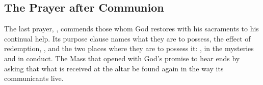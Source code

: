 \subsection{The Prayer after Communion}

The last prayer, , commends
those whom God restores with his sacraments to his continual help. Its purpose
clause names what they are to possess, the effect of redemption,
, and the two places where they are to possess
it: , in the mysteries and in conduct.
The Mass that opened with God's promise to hear ends by asking that what is
received at the altar be found again in the way its communicants live.
